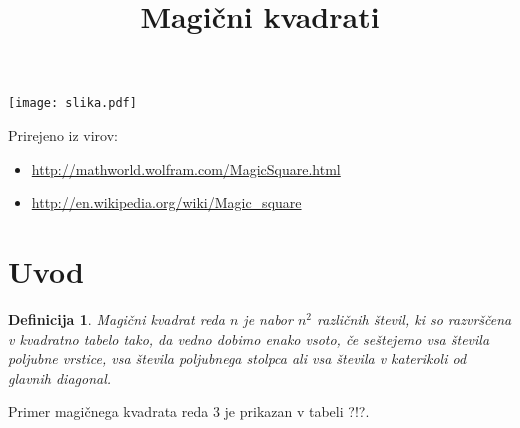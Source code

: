\documentclass[a4paper,12pt]{article}
\title{Magični kvadrati}
\date{}
{\theoremstyle{definition}
\newtheorem{definicija}{Definicija}}
{\theoremstyle{plain}
\newtheorem{izrek}{Izrek}}
\newtheorem{definicija}{Definicija}}
\begin{document}
\maketitle

\begin{center}
   \texttt{[image: slika.pdf]}
\end{center}

Prirejeno iz virov:

\begin{itemize}
   \item \url{http://mathworld.wolfram.com/MagicSquare.html}
   \item \url{http://en.wikipedia.org/wiki/Magic_square}
\end{itemize}

\tableofcontents


\newpage

\section{Uvod}

\begin{definicija}
   \emph{Magični kvadrat} reda $n$ je nabor $n^2$ različnih števil,
   ki so razvrščena v kvadratno tabelo tako, da vedno dobimo enako vsoto,
   če seštejemo vsa števila poljubne vrstice, vsa števila poljubnega
   stolpca ali vsa števila v katerikoli od glavnih diagonal.
\end{definicija}

Primer magičnega kvadrata reda 3 je prikazan v tabeli ?!?.
\end{document}
